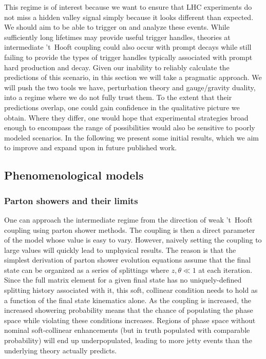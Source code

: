 This regime is of interest because we want to ensure that LHC experiments do not miss a hidden valley signal simply because it looks different than expected. We should aim to be able to trigger on and analyze these events. While sufficiently long lifetimes may provide useful trigger handles, theories at intermediate 't~Hooft coupling could also occur with prompt decays while still failing to provide the types of trigger handles typically associated with prompt hard production and decay. Given our inability to reliably calculate the predictions of this scenario, in this section we will take a pragmatic approach. We will push the two tools we have, perturbation theory and gauge/gravity duality, into a regime where we do not fully trust them. To the extent that their predictions overlap, one could gain confidence in the qualitative picture we obtain. Where they differ, one would hope that experimental strategies broad enough to encompass the range of possibilities would also be sensitive to poorly modeled scenarios. In the following we present some initial results, which we aim to improve and expand upon in future published work.


\subsection{Phenomenological models}

\subsubsection{Parton showers and their limits}

One can  approach the intermediate regime from the direction of weak 't~Hooft coupling using parton shower methods. The coupling is then a direct parameter of the model whose value is easy to vary. However, naively setting the coupling to large values will quickly lead to unphysical results. The reason is that the simplest derivation of parton shower evolution equations assume that the final state can be organized as a series of splittings where $z, \theta \ll 1$ at each iteration. Since the full matrix element for a given final state has no uniquely-defined splitting history associated with it, this soft, collinear condition needs to hold as a function of the final state kinematics alone. As the coupling is increased, the increased showering probability means that the chance of populating the phase space while violating these conditions increases. Regions of phase space without nominal soft-collinear enhancements (but in truth  populated with comparable probability) will end up underpopulated, leading to more jetty events than the underlying theory actually predicts.


